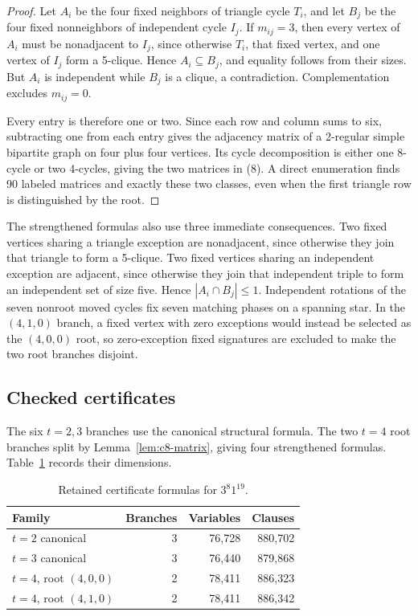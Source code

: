 \documentclass[11pt]{article}
\begin{document}
\begin{proof}
Let $A_i$ be the four fixed neighbors of triangle cycle $T_i$, and let
$B_j$ be the four fixed nonneighbors of independent cycle $I_j$. If
$m_{ij}=3$, then every vertex of $A_i$ must be nonadjacent to $I_j$, since
otherwise $T_i$, that fixed vertex, and one vertex of $I_j$ form a
5-clique. Hence $A_i\subseteq B_j$, and equality follows from their sizes.
But $A_i$ is independent while $B_j$ is a clique, a contradiction.
Complementation excludes $m_{ij}=0$.

Every entry is therefore one or two. Since each row and column sums to six,
subtracting one from each entry gives the adjacency matrix of a 2-regular
simple bipartite graph on four plus four vertices. Its cycle decomposition
is either one 8-cycle or two 4-cycles, giving the two matrices in (8). A
direct enumeration finds 90 labeled matrices and exactly these two classes,
even when the first triangle row is distinguished by the root.
\end{proof}

The strengthened formulas also use three immediate consequences. Two fixed
vertices sharing a triangle exception are nonadjacent, since otherwise they
join that triangle to form a 5-clique. Two fixed vertices sharing an
independent exception are adjacent, since otherwise they join that
independent triple to form an independent set of size five. Hence
$|A_i\cap B_j|\le1$. Independent rotations of the seven nonroot moved
cycles fix seven matching phases on a spanning star. In the $(4,1,0)$
branch, a fixed vertex with zero exceptions would instead be selected as the
$(4,0,0)$ root, so zero-exception fixed signatures are excluded to make the
two root branches disjoint.

\subsection{Checked certificates}

The six $t=2,3$ branches use the canonical structural formula. The two
$t=4$ root branches split by Lemma~\ref{lem:c8-matrix}, giving four
strengthened formulas. Table~\ref{tab:c8-formulas} records their dimensions.

\begin{table}[h]
\centering
\begin{tabular}{lrrr}
\toprule
Family & Branches & Variables & Clauses\\
\midrule
$t=2$ canonical & 3 & 76,728 & 880,702\\
$t=3$ canonical & 3 & 76,440 & 879,868\\
$t=4$, root $(4,0,0)$ & 2 & 78,411 & 886,323\\
$t=4$, root $(4,1,0)$ & 2 & 78,411 & 886,342\\
\bottomrule
\end{tabular}
\caption{Retained certificate formulas for $3^8 1^{19}$.}
\label{tab:c8-formulas}
\end{table}
\end{document}

